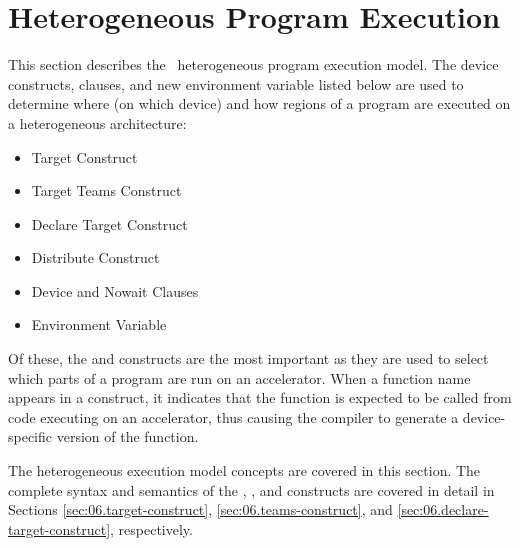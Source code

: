 \section{Heterogeneous Program Execution}
\label{sec:06.execution-model}

This section describes the \OMP\ heterogeneous program execution model.
The device constructs, clauses, and new environment variable
listed below are used to determine where (on which device) and how regions of a
program are executed on a heterogeneous architecture: 

\begin{itemize}
  \item Target Construct
  \item Target Teams Construct
  \item Declare Target Construct
  \item Distribute Construct
  \item Device and Nowait Clauses
  \item {} Environment Variable
\end{itemize}

Of these, the  and  constructs are the
most important as they are used to select which parts of a program are run on
an accelerator.  When a function name appears in a 
construct, it indicates that the function is expected to be called from code
executing on an accelerator, thus causing the compiler to generate a
device-specific version of the function.  

The heterogeneous execution model concepts are covered in this section.  The
complete syntax and semantics of the , , and
 constructs are covered in detail in Sections
\ref{sec:06.target-construct}, \ref{sec:06.teams-construct}, and
\ref{sec:06.declare-target-construct}, respectively.

